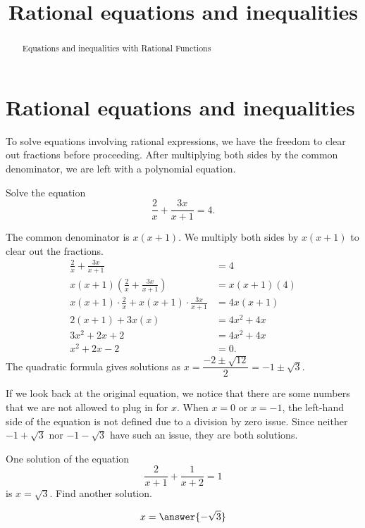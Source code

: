 \documentclass{ximera}
\title[Dig-In:]{Rational equations and inequalities}
\begin{document}
\begin{abstract}
 Equations and inequalities with Rational Functions
\end{abstract}
\maketitle


\section{Rational equations and inequalities}
To solve equations involving rational expressions, we have the freedom to clear out fractions before proceeding.
After multiplying both sides by the common denominator, we are left with a polynomial equation.
\begin{example}
	Solve the equation
	\[  \frac{2}{x} + \frac{3x}{x+1} = 4.\]
	\begin{explanation}
		The common denominator is $x(x+1)$.  We multiply both sides by $x(x+1)$ to clear out the fractions.
		\begin{align*}
			\frac{2}{x} + \frac{3x}{x+1} &= 4	\\
			x(x+1) \left( \frac{2}{x} + \frac{3x}{x+1} \right) &= x(x+1) ( 4 )\\
			x(x+1) \cdot \frac{2}{x}  + x(x+1) \cdot \frac{3x}{x+1} &= 4x(x+1)\\
			2(x+1) + 3x(x) &= 4x^2 + 4x\\
			3x^2 + 2x + 2 &= 4x^2 + 4x\\
			x^2 + 2x - 2 &= 0.
		\end{align*}
		The quadratic formula gives solutions as $\displaystyle x = \dfrac{-2 \pm \sqrt{12}}{2} = -1 \pm \sqrt{3}$.
		
		If we look back at the original equation, we notice that there are some numbers that we are not allowed to plug in for $x$.  When $x=0$ or $x=-1$,
		the left-hand side of the equation is not defined due to a division by zero issue.  Since neither $-1 + \sqrt{3}$ nor $-1-\sqrt{3}$ have such an issue,
		they are both solutions.
	\end{explanation}
\end{example}

\begin{question}
	One solution of the equation \[ \dfrac{2}{x+1}+ \dfrac{1}{x+2} = 1 \] is $x = \sqrt{3}$.  Find another solution. 
	\begin{prompt}
		\[ x = \answer{-\sqrt{3}} \]
	\end{prompt}
\end{question}
\end{document}
